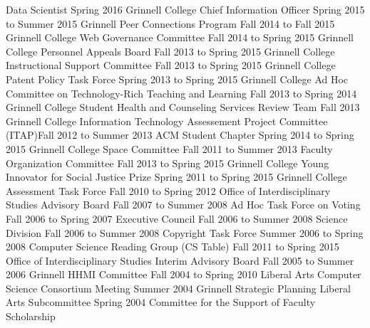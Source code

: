 \begin{cventries}
  {Data Scientist}
  {Spring 2016}
  {Grinnell College Chief Information Officer}
  {Spring 2015 to Summer 2015}
  {Grinnell Peer Connections Program}
  {Fall 2014 to Fall 2015}
  {Grinnell College Web Governance Committee}
  {Fall 2014 to Spring 2015}
  {Grinnell College Personnel Appeals Board}
  {Fall 2013 to Spring 2015}
  {Grinnell College Instructional Support Committee}
  {Fall 2013 to Spring 2015}
  {Grinnell College Patent Policy Task Force}
  {Spring 2013 to Spring 2015}
  {Grinnell College Ad Hoc Committee on Technology-Rich Teaching and Learning}
  {Fall 2013 to Spring 2014}
  {Grinnell College Student Health and Counseling Services Review Team}
  {Fall 2013}
  {Grinnell College Information Technology Assessement Project Committee (ITAP)}{Fall 2012 to Summer 2013}
  {ACM Student Chapter}
  {Spring 2014 to Spring 2015}
  {Grinnell College Space Committee}
  {Fall 2011 to Summer 2013}
  {Faculty Organization Committee}
  {Fall 2013 to Spring 2015}
  {Grinnell College Young Innovator for Social Justice Prize}
  {Spring 2011 to Spring 2015}
  {Grinnell College Assessment Task Force}
  {Fall 2010 to Spring 2012}
  {Office of Interdisciplinary Studies Advisory Board}
  {Fall 2007 to Summer 2008}
  {Ad Hoc Task Force on Voting}
  {Fall 2006 to Spring 2007}
  {Executive Council}
  {Fall 2006 to Summer 2008}
  {Science Division}
  {Fall 2006 to Summer 2008}
  {Copyright Task Force}
  {Summer 2006 to Spring 2008}
  {Computer Science Reading Group (CS Table)}
  {Fall 2011 to Spring 2015}
  {Office of Interdisciplinary Studies Interim Advisory Board}
  {Fall 2005 to Summer 2006}
  {Grinnell HHMI Committee}
  {Fall 2004 to Spring 2010}
  {Liberal Arts Computer Science Consortium Meeting}
  {Summer 2004}
  {Grinnell Strategic Planning Liberal Arts Subcommittee}
  {Spring 2004}
  {Committee for the Support of Faculty Scholarship}

\end{cventries}
